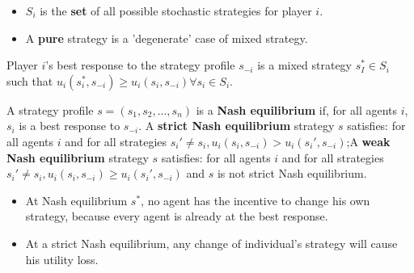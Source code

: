 \begin{refsection}
\begin{remark} \hfill
\begin{itemize}
    \item $S_i$ is the \textbf{set} of all possible stochastic strategies for player $i$.
    \item A \textbf{pure} strategy is a 'degenerate' case of mixed strategy.
\end{itemize}

\end{remark}

\begin{definition}
\cite[11]{leyton2008essentials} Player $i$'s best response to the strategy profile $s_{-i}$ is a mixed strategy $s_I^* \in S_i$ such that $u_i(s_i^*,s_{-i}) \geq u_i(s_i,s_{-i}) \forall s_i\in S_i$.
\end{definition}

\begin{remark}[uniqueness]

\end{remark}

\begin{definition}\label{ch:game-theory:def:NashEquilibriumMixedStrategiesStaticGames}
\cite[11]{leyton2008essentials} A strategy profile $s=(s_1,s_2,...,s_n)$ is a \textbf{Nash equilibrium} if, for all agents $i$, $s_i$ is a best response to $s_{-i}$. A \textbf{strict Nash equilibrium} strategy $s$ satisfies: for all agents $i$ and for all strategies $s_i' \neq s_i, u_i(s_i,s_{-i}) > u_i(s_i',s_{-i})$;A \textbf{weak Nash equilibrium} strategy $s$ satisfies: for all agents $i$ and for all strategies $s_i' \neq s_i, u_i(s_i,s_{-i}) \geq u_i(s_i',s_{-i})$ and $s$ is not strict Nash equilibrium.
\end{definition}



\begin{remark} \hfill
\begin{itemize}
    \item At Nash equilibrium $s^*$, no agent has the incentive to change his own strategy, because every agent is already at the best response. 
    \item At a strict Nash equilibrium, any change of individual's strategy will cause his utility loss.
\end{itemize}

\end{remark}


\end{refsection}
